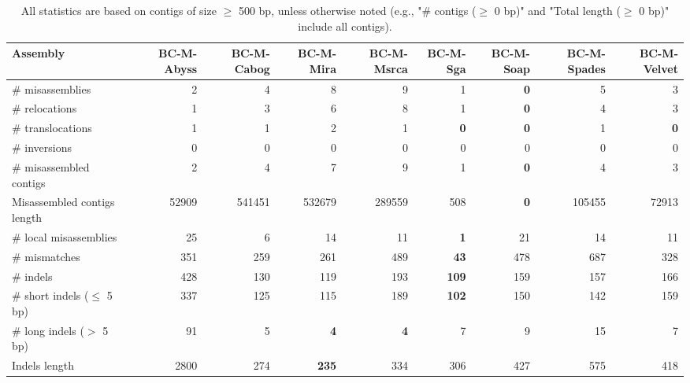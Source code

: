 \documentclass[12pt,a4paper]{article}
\begin{document}
\begin{table}[ht]
\begin{center}
\caption{All statistics are based on contigs of size $\geq$ 500 bp, unless otherwise noted (e.g., "\# contigs ($\geq$ 0 bp)" and "Total length ($\geq$ 0 bp)" include all contigs).}
\begin{tabular}{|l*{8}{|r}|}
\hline
Assembly & BC-M-Abyss & BC-M-Cabog & BC-M-Mira & BC-M-Msrca & BC-M-Sga & BC-M-Soap & BC-M-Spades & BC-M-Velvet \\ \hline
\# misassemblies & 2 & 4 & 8 & 9 & 1 & {\bf 0} & 5 & 3 \\ \hline
\hspace{5mm}\# relocations & 1 & 3 & 6 & 8 & 1 & {\bf 0} & 4 & 3 \\ \hline
\hspace{5mm}\# translocations & 1 & 1 & 2 & 1 & {\bf 0} & {\bf 0} & 1 & {\bf 0} \\ \hline
\hspace{5mm}\# inversions & 0 & 0 & 0 & 0 & 0 & 0 & 0 & 0 \\ \hline
\# misassembled contigs & 2 & 4 & 7 & 9 & 1 & {\bf 0} & 4 & 3 \\ \hline
Misassembled contigs length & 52909 & 541451 & 532679 & 289559 & 508 & {\bf 0} & 105455 & 72913 \\ \hline
\# local misassemblies & 25 & 6 & 14 & 11 & {\bf 1} & 21 & 14 & 11 \\ \hline
\# mismatches & 351 & 259 & 261 & 489 & {\bf 43} & 478 & 687 & 328 \\ \hline
\# indels & 428 & 130 & 119 & 193 & {\bf 109} & 159 & 157 & 166 \\ \hline
\hspace{5mm}\# short indels ($\leq$ 5 bp) & 337 & 125 & 115 & 189 & {\bf 102} & 150 & 142 & 159 \\ \hline
\hspace{5mm}\# long indels ($>$ 5 bp) & 91 & 5 & {\bf 4} & {\bf 4} & 7 & 9 & 15 & 7 \\ \hline
Indels length & 2800 & 274 & {\bf 235} & 334 & 306 & 427 & 575 & 418 \\ \hline
\end{tabular}
\end{center}
\end{table}
\end{document}
